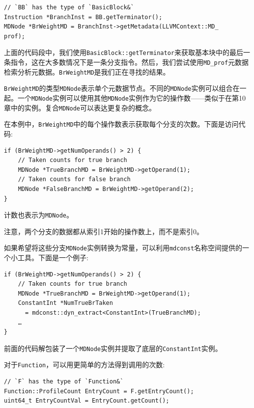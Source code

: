 \begin{lstlisting}[style=styleCXX]
// `BB` has the type of `BasicBlock&`
Instruction *BranchInst = BB.getTerminator();
MDNode *BrWeightMD = BranchInst->getMetadata(LLVMContext::MD_
prof);
\end{lstlisting}

上面的代码段中，我们使用\texttt{BasicBlock::getTerminator}来获取基本块中的最后一条指令，这在大多数情况下是一条分支指令。然后，我们尝试使用\texttt{MD\_prof}元数据检索分析元数据。\texttt{BrWeightMD}是我们正在寻找的结果。
 
\texttt{BrWeightMD}的类型\texttt{MDNode}表示单个元数据节点。不同的\texttt{MDNode}实例可以组合在一起。一个\texttt{MDNode}实例可以使用其他\texttt{MDNode}实例作为它的操作数——类似于在第10章中的实例。复合\texttt{MDNode}可以表达更复杂的概念。

在本例中，\texttt{BrWeightMD}中的每个操作数表示获取每个分支的次数。下面是访问代码:

\begin{lstlisting}[style=styleCXX]
if (BrWeightMD->getNumOperands() > 2) {
	// Taken counts for true branch
	MDNode *TrueBranchMD = BrWeightMD->getOperand(1);
	// Taken counts for false branch
	MDNode *FalseBranchMD = BrWeightMD->getOperand(2);
}
\end{lstlisting}

计数也表示为\texttt{MDNode}。

\begin{tcolorbox}[colback=blue!5!white,colframe=blue!75!black, fonttitle=\bfseries,title=两个分支的操作数索引]	
\hspace*{0.7cm}注意，两个分支的数据都从索引1开始的操作数上，而不是索引0。
\end{tcolorbox}

如果希望将这些分支\texttt{MDNode}实例转换为常量，可以利用\texttt{mdconst}名称空间提供的一个小工具。下面是一个例子:

\begin{lstlisting}[style=styleCXX]
if (BrWeightMD->getNumOperands() > 2) {
	// Taken counts for true branch
	MDNode *TrueBranchMD = BrWeightMD->getOperand(1);
	ConstantInt *NumTrueBrTaken
	  = mdconst::dyn_extract<ConstantInt>(TrueBranchMD);
	…
}
\end{lstlisting}

前面的代码解包装了一个\texttt{MDNode}实例并提取了底层的\texttt{ConstantInt}实例。

对于\texttt{Function}，可以用更简单的方法得到调用的次数:

\begin{lstlisting}[style=styleCXX]
// `F` has the type of `Function&`
Function::ProfileCount EntryCount = F.getEntryCount();
uint64_t EntryCountVal = EntryCount.getCount();
\end{lstlisting}

